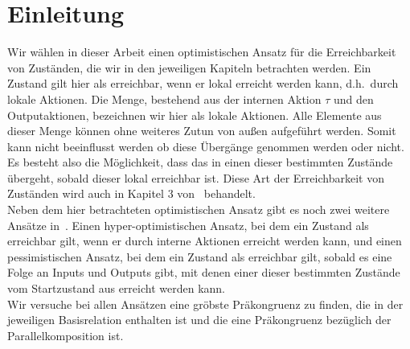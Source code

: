 \chapter{Einleitung}

Wir wählen in dieser Arbeit einen optimistischen Ansatz für die
Erreichbarkeit von Zuständen, die wir in den jeweiligen Kapiteln betrachten
werden. Ein Zustand gilt hier als erreichbar, wenn er lokal
erreicht werden kann, d.h.\ durch lokale Aktionen. Die Menge, bestehend aus der
internen Aktion $\tau$ und den Outputaktionen, bezeichnen wir hier als lokale
Aktionen. Alle Elemente aus dieser Menge können ohne
weiteres Zutun von außen aufgeführt werden. Somit kann nicht beeinflusst werden ob diese
Übergänge genommen werden oder nicht. Es besteht also die Möglichkeit, dass
das \EIO{} in einen dieser bestimmten Zustände übergeht, sobald dieser lokal erreichbar ist. Diese
Art der Erreichbarkeit von Zuständen wird auch in Kapitel 3 von~\cite{Vogler2014EIO}
behandelt.\\
Neben dem hier betrachteten optimistischen Ansatz gibt es noch zwei weitere
Ansätze in~\cite{Vogler2014EIO}. Einen hyper-optimistischen Ansatz, bei dem ein
Zustand als erreichbar gilt, wenn er durch interne Aktionen erreicht werden
kann, und einen pessimistischen Ansatz, bei dem ein Zustand als erreichbar gilt,
sobald es eine Folge an Inputs und Outputs gibt, mit denen einer dieser
bestimmten Zustände vom Startzustand aus erreicht werden kann.\\
Wir versuche bei allen Ansätzen eine gröbste Präkongruenz zu finden, die in der
jeweiligen Basisrelation enthalten ist und die eine Präkongruenz bezüglich der
Parallelkomposition ist.
